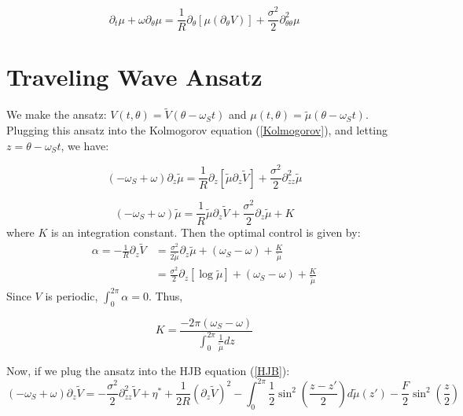 \documentclass[]{article}
\begin{document}
\begin{equation}
\partial_t \mu+\omega \partial_{\theta} \mu= \frac{1}{R} \partial_{\theta}\left[\mu(\partial_\theta V) \right]+ \frac{\sigma^2}{2} \partial_{\theta \theta}^2 \mu
\label{Kolmogorov}
\end{equation}

\section{Traveling Wave Ansatz}

We make the ansatz: $V(t,\theta)=\tilde{V}(\theta-\omega_S t)$ and $\mu(t,\theta)=\tilde{\mu}(\theta-\omega_S t)$. Plugging this ansatz into the Kolmogorov equation (\ref{Kolmogorov}), and letting $z=\theta-\omega_St$, we have:

\begin{equation}
(-\omega_S+\omega)\partial_z \tilde{\mu}=\frac{1}{R} \partial_z \left[\tilde{\mu}\partial_z \tilde{V} \right]+\frac{\sigma^2}{2}\partial_{zz}^2 \tilde{\mu}
\end{equation}

\begin{equation}
(-\omega_S+\omega)\tilde{\mu}=\frac{1}{R} \tilde{\mu}\partial_z \tilde{V}+\frac{\sigma^2}{2}\partial_{z} \tilde{\mu}+ K
\end{equation}
where $K$ is an integration constant. Then the optimal control is given by:
\begin{equation}
\begin{split}
\alpha=-\frac{1}{R}\partial_z \tilde{V}&=\frac{\sigma^2}{2\tilde{\mu}}\partial_{z} \tilde{\mu}+(\omega_S-\omega)+\frac{K}{\tilde{\mu}} \\
&=\frac{\sigma^2}{2}\partial_{z} \left[\log\tilde{\mu}\right]+(\omega_S-\omega)+\frac{K}{\tilde{\mu}}
\end{split}
\label{alpha}
\end{equation}
Since $V$ is periodic, $\int_{0}^{2\pi}\alpha=0$. Thus,

\begin{equation}
K=\frac{-2\pi(\omega_S-\omega) }{\int_0^{2\pi} \frac{1}{\tilde{\mu}}dz}
\label{K}
\end{equation}

Now, if we plug the ansatz into the HJB equation (\ref{HJB}):
\begin{equation}
(-\omega_S+\omega)\partial_z \tilde{V}=-\frac{\sigma^2}{2}\partial_{zz}^2 \tilde{V}+\eta^*+\frac{1}{2R}(\partial_z\tilde{V})^2-\int_0^{2\pi}\frac{1}{2} \sin^2\left(\frac{z-z'}{2}\right)d \tilde{\mu}(z')-\frac{F}{2} \sin^2\left(\frac{z}{2}\right)
\end{equation}
\end{document}
